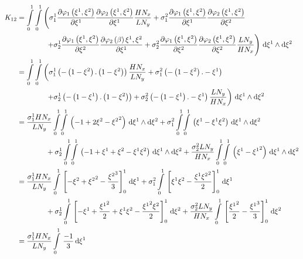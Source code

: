 \begin{equation}
  \begin{aligned}
    K_{12}&=\dintl{0}{1}\dintl{0}{1}\left(
    \conductivitytensorsymbol^{1}_{1}\delby{\lbfn{1}{\xione,\xitwo}}{\xione}
    \delby{\lbfn{2}{\xione,\xitwo}}{\xione}\dfrac{H N_{x}}{L N_{y}}+
    \conductivitytensorsymbol^{2}_{1}\delby{\lbfn{1}{\xione,\xitwo}}{\xione}
    \delby{\lbfn{2}{\xione,\xitwo}}{\xitwo}\right.\\
    &\qquad\qquad\left.+\conductivitytensorsymbol^{1}_{2}\delby{\lbfn{1}{\xione,\xitwo}}{\xitwo}
    \delby{\lbfn{2}{\beta}{\xione,\xitwo}}{\xione}+
    \conductivitytensorsymbol^{2}_{2}\delby{\lbfn{1}{\xione,\xitwo}}{\xitwo}
    \delby{\lbfn{2}{\xione,\xitwo}}{\xitwo}\dfrac{L N_{y}}{H N_{x}}\right)\infinitesimaltwo{\xione}{\xitwo}\\
    &=\dintl{0}{1}\dintl{0}{1}\left(
    \conductivitytensorsymbol^{1}_{1}\pbrac{-\pbrac{1-\xitwo}.\pbrac{1-\xitwo}}\dfrac{H N_{x}}{L N_{y}}+
    \conductivitytensorsymbol^{2}_{1}\pbrac{-\pbrac{1-\xitwo}.-\xione}\right.\\
    &\qquad\qquad\left.+\conductivitytensorsymbol^{1}_{2}\pbrac{-\pbrac{1-\xione}.\pbrac{1-\xitwo}}+
    \conductivitytensorsymbol^{2}_{2}\pbrac{-\pbrac{1-\xione}.-\xione}\dfrac{L N_{y}}{H N_{x}}\right)
    \infinitesimaltwo{\xione}{\xitwo}\\
    &=\dfrac{\conductivitytensorsymbol^{1}_{1} H N_{x}}{L N_{y}}\giint{0}{1}{0}{1}{\pbrac{-1+2\xitwo-\xitwosq}}{\xione}{\xitwo}
    +\conductivitytensorsymbol^{2}_{1}\giint{0}{1}{0}{1}{\pbrac{\xione-\xione\xitwo}}{\xione}{\xitwo}\\
    &\qquad\qquad+\conductivitytensorsymbol^{1}_{2}\giint{0}{1}{0}{1}{\pbrac{-1+\xione+\xitwo-\xione\xitwo}}{\xione}{\xitwo}
    +\dfrac{\conductivitytensorsymbol^{2}_{2} L N_{y}}{H N_{x}}\giint{0}{1}{0}{1}{\pbrac{\xione-\xionesq}}{\xione}{\xitwo} \\
    &=\dfrac{\conductivitytensorsymbol^{1}_{1} H N_{x}}{L N_{y}}\gint{0}{1}{\sqbrac{-\xitwo+\xitwosq-\dfrac{\xitwocube}{3}}^{1}_{0}}{\xione}
    +\conductivitytensorsymbol^{2}_{1}\gint{0}{1}{\sqbrac{\xione\xitwo-\dfrac{\xione\xitwosq}{2}}^{1}_{0}}{\xione}\\
    &\qquad\qquad+\conductivitytensorsymbol^{1}_{2}\gint{0}{1}{\sqbrac{-\xione+\dfrac{\xionesq}{2}+\xione\xitwo-\dfrac{\xionesq\xitwo}{2}}^{1}_{0}}{\xitwo}
    +\dfrac{\conductivitytensorsymbol^{2}_{2} L N_{y}}{H N_{x}}\gint{0}{1}{\sqbrac{\dfrac{\xionesq}{2}-\dfrac{\xionecube}{3}}^{1}_{0}}{\xitwo} \\
    &=\dfrac{\conductivitytensorsymbol^{1}_{1} H N_{x}}{L N_{y}}\gint{0}{1}{\dfrac{-1}{3}}{\xione}

\end{aligned}
\end{equation}
